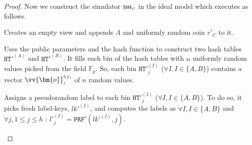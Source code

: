 \begin{proof}
Now we construct the simulator $\textsf {\scriptsize SIM}_{\scriptscriptstyle C}$ in the ideal model which executes as follows. 

\begin{packed_enum}
\item Creates an empty view and appends $\Lambda$ and uniformly random coin $r'_{\scriptscriptstyle C}$ to it. 

\item Uses the public parameters and the hash function to construct two hash tables $\mathtt{HT}'^{\scriptscriptstyle (A)}$ and $\mathtt{HT}'^{\scriptscriptstyle (B)}$. It fills each bin of the hash tables with $n$ uniformly random values picked from the field $\mathbb{F}_p$. So, each bin $\mathtt{HT}'^{\scriptscriptstyle (I)}_{\scriptscriptstyle j}$ ($\forall I, I\in \{A,B\}$) contains a vector  $\vv{\bm{o}}'^{\scriptscriptstyle (I)}_{\scriptscriptstyle j}$ of $n$ random values. 




%
%
%
%


\item \label{labelGen}Assigns a pseudorandom label to each bin $\mathtt{HT}'^{\scriptscriptstyle (I)}_{\scriptscriptstyle j}$ ($\forall I, I\in \{A,B\}$). To do so, it picks fresh label-keys, $lk'^{\scriptscriptstyle(I)}$, and computes the labels as $\forall I, I\in \{A,B\}$ and $\forall j,  1\leq j \leq h$ : $l'^{\scriptscriptstyle (I)}_{\scriptscriptstyle j}=\mathtt{PRF}'(lk'^{\scriptscriptstyle (I)},j)$.





\end{packed_enum}
\end{proof}
